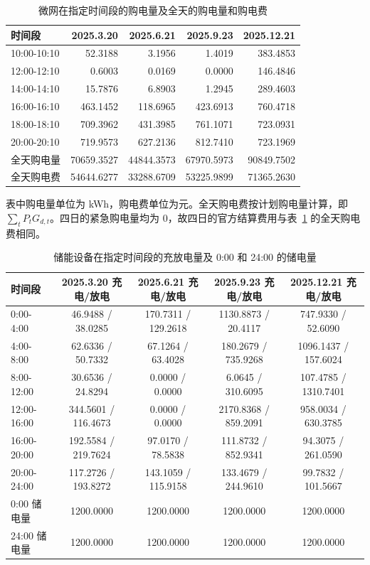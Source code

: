 \begin{table}[htbp]
\centering
\caption{微网在指定时间段的购电量及全天的购电量和购电费}
\label{tab:purchase2}
\begin{tabular}{lrrrr}
\toprule
时间段 & 2025.3.20 & 2025.6.21 & 2025.9.23 & 2025.12.21 \\
\midrule
10:00-10:10 & 52.3188 & 3.1956 & 1.4019 & 383.4853 \\
12:00-12:10 & 0.6003 & 0.0169 & 0.0000 & 146.4846 \\
14:00-14:10 & 15.7876 & 6.8903 & 1.2945 & 289.4603 \\
16:00-16:10 & 463.1452 & 118.6965 & 423.6913 & 760.4718 \\
18:00-18:10 & 709.3962 & 431.3985 & 761.1071 & 723.0931 \\
20:00-20:10 & 719.9573 & 627.2136 & 812.7410 & 723.1969 \\
全天购电量 & 70659.3527 & 44844.3573 & 67970.5973 & 90849.7502 \\
全天购电费 & 54644.6277 & 33288.6709 & 53225.9899 & 71365.2630 \\
\bottomrule
\end{tabular}
\end{table}

表中购电量单位为 kWh，购电费单位为元。全天购电费按计划购电量计算，即 $\sum_t P_tG_{d,t}$。四日的紧急购电量均为 $0$，故四日的官方结算费用与表~\ref{tab:purchase2} 的全天购电费相同。

\begin{table}[htbp]
\centering
\caption{储能设备在指定时间段的充放电量及 0:00 和 24:00 的储电量}
\label{tab:storage2}
\begin{tabular}{lcccc}
\toprule
时间段 & 2025.3.20 充电/放电 & 2025.6.21 充电/放电 & 2025.9.23 充电/放电 & 2025.12.21 充电/放电 \\
\midrule
0:00-4:00 & 46.9488 / 38.0285 & 170.7311 / 129.2618 & 1130.8873 / 20.4117 & 747.9330 / 52.6090 \\
4:00-8:00 & 62.6336 / 50.7332 & 67.1264 / 63.4028 & 180.2679 / 735.9268 & 1096.1437 / 157.6024 \\
8:00-12:00 & 30.6536 / 24.8294 & 0.0000 / 0.0000 & 6.0645 / 310.6095 & 107.4785 / 1310.7401 \\
12:00-16:00 & 344.5601 / 116.4673 & 0.0000 / 0.0000 & 2170.8368 / 859.2091 & 958.0034 / 630.3785 \\
16:00-20:00 & 192.5584 / 219.7624 & 97.0170 / 78.5838 & 111.8732 / 852.9341 & 94.3075 / 261.0590 \\
20:00-24:00 & 117.2726 / 193.8272 & 143.1059 / 115.9158 & 133.4679 / 244.9610 & 99.7832 / 101.5667 \\
0:00 储电量 & 1200.0000 & 1200.0000 & 1200.0000 & 1200.0000 \\
24:00 储电量 & 1200.0000 & 1200.0000 & 1200.0000 & 1200.0000 \\
\bottomrule
\end{tabular}
\end{table}


